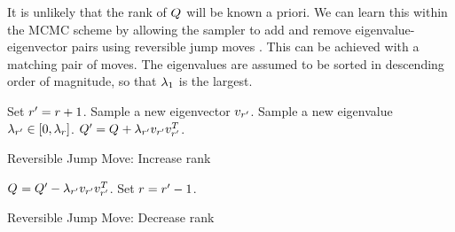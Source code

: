 \documentclass[a4paper,10pt]{article}
\begin{document}
It is unlikely that the rank of $\lgtv$ will be known a priori. We can learn this within the MCMC scheme by allowing the sampler to add and remove eigenvalue-eigenvector pairs using reversible jump moves \cite{Green1995,Green2009}. This can be achieved with a matching pair of moves. The eigenvalues are assumed to be sorted in descending order of magnitude, so that $\lambda_{1}$ is the largest.

\begin{algorithm}
\begin{algorithmic}
 \REQUIRE{$\rk$, $\lgtv$}
 \STATE Set $r^{\prime} = r + 1$.
 \STATE Sample a new eigenvector $v_{r^{\prime}}$.
 \STATE Sample a new eigenvalue $\lambda_{r^{\prime}} \in [0,\lambda_{r}]$.
 \STATE $Q_{}^{\prime} = Q_{} + \lambda_{r^{\prime}}v_{r^{\prime}}v_{r^{\prime}}^{T}$.
 \RETURN{$\rk\mcnew$, $\lgtv\mcnew$}
\end{algorithmic}
\caption{Reversible Jump Move: Increase rank}
\label{alg:rjmcmc-up}
\end{algorithm}

\begin{algorithm}
\begin{algorithmic}
 \REQUIRE{$\rk\mcnew$, $\lgtv\mcnew$}
 \STATE $Q_{} = Q_{}^{\prime} - \lambda_{r^{\prime}}v_{r^{\prime}}v_{r^{\prime}}^{T}$.
 \STATE Set $r = r^{\prime} - 1$.
 \RETURN{$\rk$, $\lgtv$}
\end{algorithmic}
\caption{Reversible Jump Move: Decrease rank}
\label{alg:rjmcmc-down}
\end{algorithm}
\end{document}
